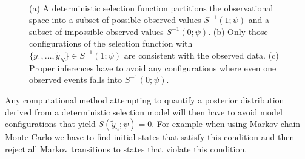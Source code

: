 \documentclass[
  letterpaper,
  DIV=11,
  numbers=noendperiod]{scrartcl}
\begin{document}
\begin{figure}
\begin{minipage}{0.45\linewidth}
{}

\subcaption{\label{fig-multi-good}}

\end{minipage}%
%
\begin{minipage}{0.45\linewidth}


\subcaption{\label{fig-multi-bad}}

\end{minipage}%
%
\begin{minipage}{0.05\linewidth}
~\end{minipage}%

\caption{\label{fig-selection-function-level-sets}(a) A deterministic
selection function partitions the observational space into a subset of
possible observed values \(S^{-1}(1; \psi)\) and a subset of impossible
observed values \(S^{-1}(0; \psi)\). (b) Only those configurations of
the selection function with
\(\{ \tilde{y}_{1}, \ldots, \tilde{y}_{N} \} \in S^{-1}(1; \psi)\) are
consistent with the observed data. (c) Proper inferences have to avoid
any configurations where even one observed events falls into
\(S^{-1}(0; \psi)\).}

\end{figure}%

Any computational method attempting to quantify a posterior distribution
derived from a deterministic selection model will then have to avoid
model configurations that yield \(S(\tilde{y}_{n}; \psi) = 0\). For
example when using Markov chain Monte Carlo we have to find initial
states that satisfy this condition and then reject all Markov
transitions to states that violate this condition.
\end{document}
